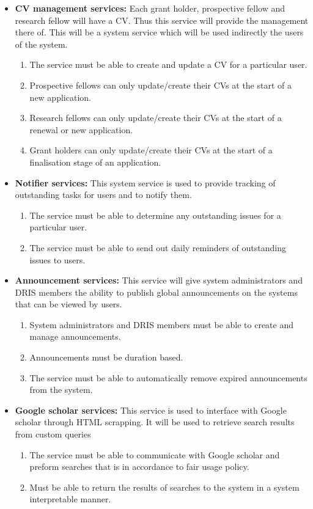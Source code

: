 \documentclass[12pt]{article}
\begin{document}
\begin{itemize}
		\item\textbf{CV management services:}
		Each grant holder, prospective fellow and research fellow will have a CV. Thus this service will provide the management there of. This will be a system service which will be used indirectly the users of the system. 
		\begin{enumerate}		
			\item The service must be able to create and update a CV for a particular user.
			\item Prospective fellows can only update/create their CVs at the start of a new application.
			\item Research fellows can only update/create their CVs at the start of a renewal or new application.
			\item Grant holders can only update/create their CVs at the start of a finalisation stage of an application.   
		\end{enumerate}
		
		\item\textbf{Notifier services:}
		This system service is used to provide tracking of outstanding tasks for users and to notify them.
		\begin{enumerate}		
			\item The service must be able to determine any outstanding issues for a particular user.
			\item The service must be able to send out daily reminders of outstanding issues to users.   
		\end{enumerate}		
		
		\item\textbf{Announcement services:}
		This service will give system administrators and DRIS members the ability to publish global announcements on the systems that can be viewed by users.
		\begin{enumerate}		
			\item System administrators and DRIS members must be able to create and manage announcements.
			\item Announcements must be duration based.
			\item The service must be able to automatically remove expired announcements from the system. 
		\end{enumerate}
		
		\item\textbf{Google scholar services:}
		This service is used to interface with Google scholar through HTML scrapping. It will be used to retrieve search results from custom queries 
		\begin{enumerate}		
			\item The service must be able to communicate with Google scholar and preform searches that is in accordance to fair usage policy.
			\item Must be able to return the results of searches to the system in a system interpretable manner.  
		\end{enumerate}
		

\end{itemize}
\end{document}
